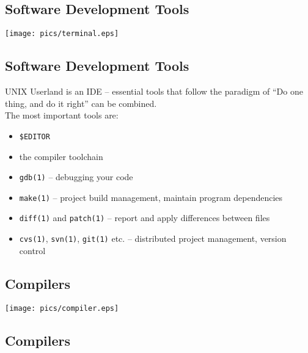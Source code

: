 \documentclass[xga]{xdvislides}
\begin{document}
\subsection{Software Development Tools}
\begin{center}
	\texttt{[image: pics/terminal.eps]}
\end{center}

\subsection{Software Development Tools}
UNIX Userland is an IDE -- essential tools that follow the paradigm of ``Do
one thing, and do it right'' can be combined. \\

The most important tools are:
\begin{itemize}
	\item \verb+$EDITOR+
	\item the compiler toolchain
	\item {\tt gdb(1)} -- debugging your code
	\item {\tt make(1)} -- project build management, maintain program
		dependencies
	\item {\tt diff(1)} and {\tt patch(1)} -- report and apply differences
		between files
	\item {\tt cvs(1)}, {\tt svn(1)}, {\tt git(1)} etc. -- distributed project management,
		 version control
\end{itemize}

%
%

\subsection{Compilers}

\begin{center}
	\texttt{[image: pics/compiler.eps]}
\end{center}

\subsection{Compilers}
\end{document}
